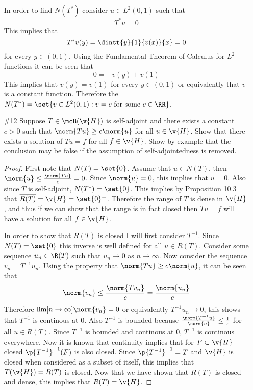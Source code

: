 \documentclass[11pt, oneside]{article}
\begin{document}
\begin{enumerate}
    In order to find $N(T^*)$ consider $u \in L^2(0, 1)$ such that
    \[
      T^* u = 0
    \]
    This implies that
    \[
      T^* v(y) = \dintt{y}{1}{v(x)}{x} = 0
    \]
    for every $y \in (0, 1)$.
    Using the Fundamental Theorem of Calculus for $L^2$ functions it can be seen
    that
    \[
      0 = -v(y) + v(1)
    \]
    This implies that $v(y) = v(1)$ for every $y \in (0, 1)$ or equivalently
    that $v$ is a constant function.
    Therefore the
    $N(T^*) = \set{v \in L^2(0, 1): v = c \text{ for some } c \in \RR}$.

  \pagebreak
  \item[\#12] %
    Suppose $T \in \mcB(\v{H})$ is self-adjoint and there exists a constant
    $c > 0$ such that $\norm{Tu} \ge c \norm{u}$ for all $u \in \v{H}$.
    Show that there exists a solution of $Tu = f$ for all $f \in \v{H}$.
    Show by example that the conclusion may be false if the assumption of
    self-adjointedness is removed.

    \begin{proof}
      First note that $N(T) = \set{0}$.
      Assume that $u \in N(T)$, then $\norm{u} \le \frac{\norm{Tu}}{c} = 0$.
      Since $\norm{u} = 0$, this implies that $u = 0$.
      Also since $T$ is self-adjoint, $N(T^*) = \set{0}$.
      This implies by Proposition 10.3 that
      $\overline{R(T)} = \v{H} = \set{0}^{\perp}$.
      Therefore the range of $T$ is dense in $\v{H}$, and thus if we can show
      that the range is in fact closed then $Tu = f$ will have a solution for
      all $f \in \v{H}$.

      In order to show that $R(T)$ is closed I will first consider $T^{-1}$.
      Since $N(T) = \set{0}$ this inverse is well defined for all $u \in R(T)$.
      Consider some sequence $u_n \in \R(T)$ such that $u_n \to 0$ as
      $n \to \infty$.
      Now consider the sequence $v_n = T^{-1}u_n$.
      Using the property that $\norm{Tu} \ge c \norm{u}$, it can be seen that
      \[
        \norm{v_n} \le \frac{\norm{Tv_n}}{c} = \frac{\norm{u_n}}{c}
      \]
      Therefore $\lim[n \to \infty]{\norm{v_n}} = 0$ or equivalently
      $T^{-1}u_n \to 0$, this shows that $T^{-1}$ is continous at $0$.
      Also $T^{-1}$ is bounded because $\frac{\norm{T^{-1}u}}{\norm{u}} \le \frac{1}{c}$
      for all $u \in R(T)$.
      Since $T^{-1}$ is bounded and continous at 0, $T^{-1}$ is continous
      everywhere.
      Now it is known that continuity implies that for $F \subset \v{H}$ closed
      $\p{T^{-1}}^{-1}(F)$ is also closed.
      Since $\p{T^{-1}}^{-1} = T$ and $\v{H}$ is closed when considered as a
      subset of itself, this implies that $T(\v{H}) = R(T)$ is closed.
      Now that we have shown that $R(T)$ is closed and dense, this implies
      that $R(T) = \v{H}$.


\end{proof}
\end{enumerate}
\end{document}
